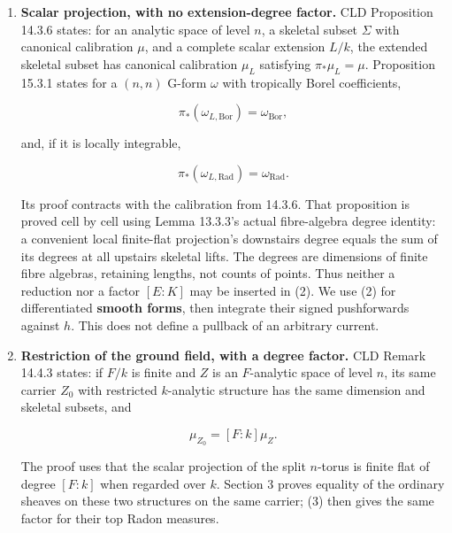 \documentclass[
  11pt,
]{article}
\begin{document}
\begin{enumerate}
  is pleasant, with tropical polyhedron the top-dimensional part of its
  compact image. Proposition 5.10.1(c,d) identifies locally integrable
  top-form Radon pushforward and integration with contraction on that
  polyhedron. The canonical calibration is standard and positive on its
  finitely many cells in each compact moment chart (CLD §§14.3.2--5). This makes any fixed smooth
  positive top form finite on a compact moment neighbourhood. Section 8
  proves the required coefficient-to-total-variation estimate directly.
\item
  \textbf{Scalar projection, with no extension-degree factor.} CLD
  Proposition 14.3.6 states: for an analytic space of level \(n\), a
  skeletal subset \(\Sigma\) with canonical calibration \(\mu\), and a
  complete scalar extension \(L/k\), the extended skeletal subset has
  canonical calibration \(\mu_L\) satisfying \(\pi_*\mu_L=\mu\).
  Proposition 15.3.1 states for a \((n,n)\) G-form \(\omega\) with
  tropically Borel coefficients,

  \[\pi_*(\omega_{L,\mathrm{Bor}})=\omega_{\mathrm{Bor}},\]

  and, if it is locally integrable,

  \[\pi_*(\omega_{L,\mathrm{Rad}})=\omega_{\mathrm{Rad}}. \tag{2}\]

  Its proof contracts with the calibration from 14.3.6. That proposition
  is proved cell by cell using Lemma 13.3.3's actual fibre-algebra
  degree identity: a convenient local finite-flat projection's
  downstairs degree equals the sum of its degrees at all upstairs
  skeletal lifts. The degrees are dimensions of finite fibre algebras,
  retaining lengths, not counts of points. Thus neither a reduction nor
  a factor \([E:K]\) may be inserted in (2). We use (2) for
  differentiated \textbf{smooth forms}, then integrate their signed
  pushforwards against \(h\). This does not define a pullback of an
  arbitrary current.
\item
  \textbf{Restriction of the ground field, with a degree factor.} CLD
  Remark 14.4.3 states: if \(F/k\) is finite and \(Z\) is an
  \(F\)-analytic space of level \(n\), its same carrier \(Z_0\) with
  restricted \(k\)-analytic structure has the same dimension and
  skeletal subsets, and

  \[\mu_{Z_0}=[F:k]\mu_Z. \tag{3}\]

  The proof uses that the scalar projection of the split \(n\)-torus is
  finite flat of degree \([F:k]\) when regarded over \(k\). Section 3
  proves equality of the ordinary sheaves on these two structures on the
  same carrier; (3) then gives the same factor for their top Radon
  measures.


\end{enumerate}
\end{document}

